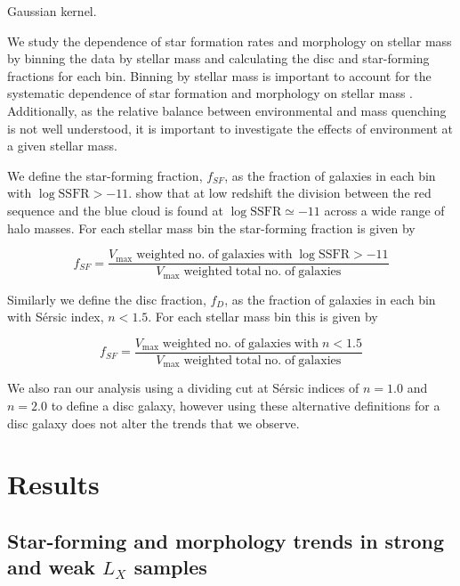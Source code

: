 Gaussian kernel.
\par
We study the dependence of star formation rates and morphology on
stellar mass by binning the data by stellar mass and calculating the
disc and star-forming fractions for each bin.  Binning by stellar mass
is important to account for the systematic dependence of star
formation and morphology on stellar mass
\citep[e.g.][]{brinchmann2004, whitaker2012}.  Additionally, as the
relative balance between environmental and mass quenching is not well
understood, it is important to investigate the effects of environment
at a given stellar mass.
\par
We define the star-forming fraction, $f_{SF}$, as the fraction of
galaxies in each bin with $\log \mathrm{SSFR} > -11$.
\citet{wetzel2012} show that at low redshift the division between the
red sequence and the blue cloud is found at $\log \mathrm{SSFR} \simeq
-11$ across a wide range of halo masses.  For each stellar mass bin
the star-forming fraction is given by

\begin{equation}
  f_{SF} =
  \frac{V_\mathrm{max}\;\mathrm{weighted}\;\mathrm{no.}\;\mathrm{of}\;\mathrm{galaxies}\;\mathrm{with}\;\log
    \mathrm{SSFR} >
    -11}{V_\mathrm{max}\;\mathrm{weighted}\;\mathrm{total}\;\mathrm{no.}\;\mathrm{of}\;\mathrm{galaxies}}
\end{equation}

\noindent
Similarly we define the disc fraction, $f_D$, as the fraction of
galaxies in each bin with S{\'e}rsic index, $n < 1.5$.  For each
stellar mass bin this is given by

\begin{equation}
  f_{SF} =
  \frac{V_\mathrm{max}\;\mathrm{weighted}\;\mathrm{no.}\;\mathrm{of}\;\mathrm{galaxies}\;\mathrm{with}\;
    n < 1.5}{V_\mathrm{max}\;\mathrm{weighted}\;\mathrm{total}\;\mathrm{no.}\;\mathrm{of}\;\mathrm{galaxies}}
\end{equation}

\noindent
We also ran our analysis using a dividing cut at S{\'e}rsic indices of
$n=1.0$ and $n=2.0$ to define a disc galaxy, however using these
alternative definitions for a disc galaxy does not alter the trends
that we observe.

\section{Results}
\label{sec:results_x}

\subsection{Star-forming and morphology trends in strong and weak
  $L_X$ samples}


